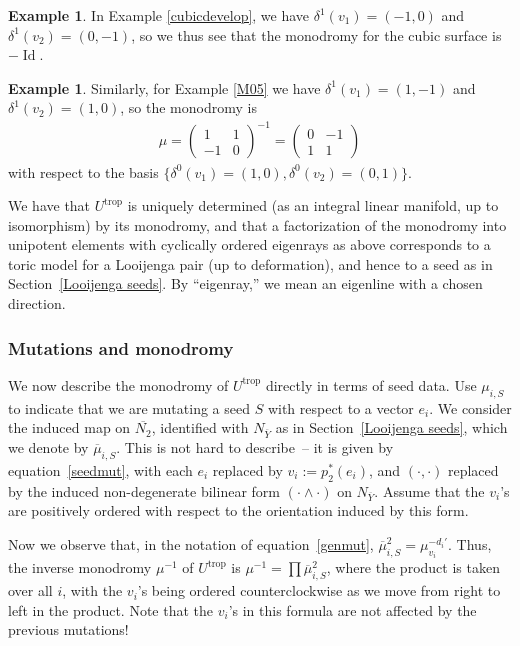 \documentclass[11pt]{article}
\numberwithin{equation}{section}
\numberwithin{figure}{section}
\numberwithin{table}{section}
\DeclareMathOperator{\id}{Id}
\DeclareMathOperator{\trop}{trop}
\let\?=\overline
\theoremstyle{definition}
\newtheorem{eg}[thm]{Example}
\begin{document}
\begin{eg}In Example \ref{cubicdevelop}, we have $\delta^1(v_1) = (-1,0)$ and $\delta^1(v_2) = (0,-1)$, so we thus see that the monodromy for the cubic surface is $-\id$.
\end{eg}

\begin{eg} \label{M05 mono}Similarly, for Example \ref{M05} we have $\delta^1(v_1) = (1,-1)$ and $\delta^1(v_2) = (1,0)$, so the monodromy is
\begin{gather*}
	\mu= \left(\begin{matrix}
		1 &1 \\
		-1 &0
		\end{matrix}\right)^{-1} =
		\left(\begin{matrix}
		0 &-1 \\
		1 &1
		\end{matrix}\right)
\end{gather*}
with respect to the basis $\big\{ \delta^0(v_1) = (1,0) , \delta^0(v_2) = (0,1) \big\}$.
\end{eg}

We have that $U^{\trop}$ is uniquely determined (as an integral linear manifold, up to isomorphism)
 by its monodromy, and that a factorization of the monodromy into unipotent elements with cyclically ordered eigenrays as above corresponds to a toric model for a Looijenga pair (up to deformation), and hence to a seed as in Section~\ref{Looijenga seeds}. By ``eigenray,'' we mean an eigenline with a chosen direction.

\subsubsection{Mutations and monodromy}\label{mutmono}

We now describe the monodromy of $U^{\trop}$ directly in terms of seed data. Use $\mu_{i,S}$ to indicate that we are mutating a seed $S$ with respect to a vector $e_i$. We consider the induced map on $\?{N_2}$, identified with $N_{\?{Y}}$ as in Section~\ref{Looijenga seeds}, which we denote by $\?{\mu}_{i,S}$. This is not hard to describe~-- it is given by equation~\eqref{seedmut}, with each $e_i$ replaced by $v_i:=p_2^*(e_i)$, and $(\cdot,\cdot)$ replaced by the induced non-degenerate bilinear form $(\cdot\wedge\cdot)$ on $N_{\?{Y}}$.
 Assume that the $v_i$'s are positively ordered with respect to the orientation induced by this form.

Now we observe that, in the notation of equation~\eqref{genmut}, $\?{\mu}_{i,S}^2=\mu_{v_i}^{-d_i'}$. Thus, the inverse monodromy $\mu^{-1}$ of $U^{\trop}$ is $\mu^{-1}= \prod \?{\mu}_{i,S}^2$, where the product is taken over all $i$, with the $v_i$'s being ordered counterclockwise as we move from right to left in the product. Note that the $v_i$'s in this formula are not affected by the previous mutations!
\end{document}
